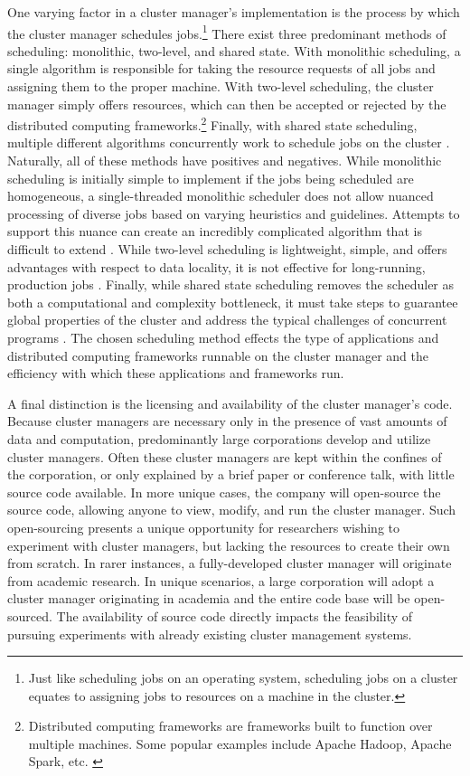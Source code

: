 One varying factor in a cluster manager's implementation is the process
by which the cluster manager schedules jobs.\footnote{Just like scheduling jobs
on an operating system, scheduling jobs on
a cluster equates to assigning jobs to resources on a machine in the cluster.}
There exist three predominant methods of scheduling: monolithic, two-level, and
shared state. With monolithic scheduling, a single algorithm
is responsible for taking the resource requests of all jobs and assigning them
to the proper machine. With two-level scheduling, the cluster manager simply
offers resources, which can then be accepted or rejected by the distributed
computing frameworks.\footnote{Distributed computing frameworks are frameworks
built to function over multiple machines. Some popular examples include
Apache Hadoop, Apache Spark, etc. \cite{mesos}}
Finally, with shared state scheduling, multiple different algorithms concurrently work to
schedule jobs on the cluster \cite{omega}. Naturally, all
of these methods have positives and negatives. While monolithic scheduling is
initially simple to implement if the jobs being scheduled are homogeneous,
a single-threaded monolithic scheduler does not allow
nuanced processing of diverse jobs based on varying heuristics and guidelines.
Attempts to support this nuance can create an incredibly
complicated algorithm that is difficult to extend \cite{omega}.
While two-level scheduling is lightweight, simple, and offers advantages with respect to
data locality, it is not effective for long-running,
production jobs \cite{omega}.
Finally, while shared state scheduling removes the scheduler as
both a computational and complexity bottleneck, it must take steps to guarantee
global properties of the cluster and address the typical challenges of
concurrent programs \cite{omega}.
The chosen scheduling method
effects the type of applications and distributed computing frameworks
runnable on the cluster manager and the efficiency with which these applications
and frameworks run.

A final distinction is the licensing and availability of the cluster manager's code.
Because cluster managers are necessary only in the presence of vast amounts of
data and computation, predominantly large
corporations develop and utilize cluster managers. Often these cluster
managers are kept within the confines of the corporation, or only explained by a
brief paper or conference talk, with little source code available. In more
unique cases, the company will open-source the source code, allowing anyone to
view, modify, and run the cluster manager. Such open-sourcing presents a unique opportunity
for researchers wishing to experiment with cluster managers, but lacking the
resources to create their own from scratch. In rarer instances, a
fully-developed cluster manager will originate from academic research. In unique
scenarios, a large corporation will adopt a cluster manager originating in
academia and the entire code base will
be open-sourced. The availability of source code directly impacts the
feasibility of pursuing experiments with already existing cluster management
systems.

